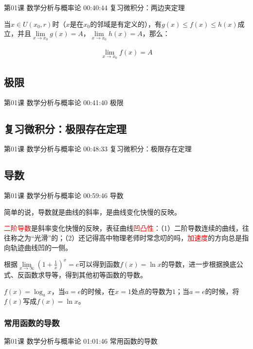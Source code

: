 \documentclass[UTF8]{ctexbook}
\begin{document}
第01课 数学分析与概率论 00:40:44 复习微积分：两边夹定理

当$x \in U(x_{0},r)$时（$x$是在$x_{0}$的邻域是有定义的），有$g(x) \leq f(x) \leq h(x)$成立，并且$\underset{x \rightarrow x_{0}}{\lim}g(x)=A$，$\underset{x \rightarrow x_{0}}{\lim}h(x)=A$，那么：

\begin{equation}
\begin{aligned}
\underset{x \rightarrow x_{0}}{\lim}f(x)=A
\end{aligned}
\end{equation}

\subsection{极限}

第01课 数学分析与概率论 00:41:40 极限

\subsection{复习微积分：极限存在定理}

第01课 数学分析与概率论 00:48:33 复习微积分：极限存在定理

\subsection{导数}

第01课 数学分析与概率论 00:59:46 导数

简单的说，导数就是曲线的斜率，是曲线变化快慢的反映。

\textcolor{red}{二阶导数}是斜率变化快慢的反映，表征曲线\textcolor{red}{凹凸性}：（1）二阶导数连续的曲线，往往称之为“光滑”的；（2）还记得高中物理老师时常念叨的吗，\textcolor{red}{加速度}的方向总是指向轨迹曲线凹的一侧。

根据$\underset{x \rightarrow \infty}{\lim} \left (  1+\frac{1}{x} \right )^{x}=e$可以得到函数$f(x)=\ln x$的导数，进一步根据换底公式、反函数求导等，得到其他初等函数的导数。

$f(x)=\log _{a}x$，当$a=e$的时候，在$x=1$处点的导数为$1$；当$a=e$的时候，将$f(x)$写成$f(x)=\ln x$。

\subsubsection{常用函数的导数}

第01课 数学分析与概率论 01:01:46 常用函数的导数
\end{document}
